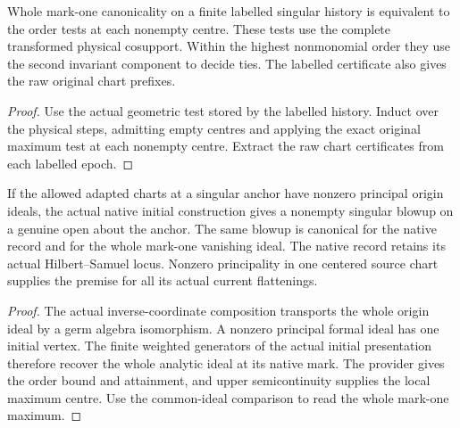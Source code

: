 \begin{theorem}
\label{hir:g8-labelled-whole-mark-one-prefix-criterion}
\leanok
Whole mark-one canonicality on a finite labelled singular
history is equivalent to the order tests at each nonempty
centre. These tests use the complete transformed physical
cosupport. Within the highest nonmonomial order they use
the second invariant component to decide ties. The labelled
certificate also gives the raw original chart prefixes.
\end{theorem}
\begin{proof}
Use the actual geometric test stored by the labelled
history. Induct over the physical steps, admitting empty
centres and applying the exact original maximum test at
each nonempty centre. Extract the raw chart certificates
from each labelled epoch.
\end{proof}

\begin{theorem}
\label{hir:g8-principal-native-initialization}
\leanok
If the allowed adapted charts at a singular anchor have
nonzero principal origin ideals, the actual native initial
construction gives a nonempty singular blowup on a genuine
open about the anchor. The same blowup is canonical for the
native record and for the whole mark-one vanishing ideal.
The native record retains its actual Hilbert--Samuel locus.
Nonzero principality in one centered source chart supplies
the premise for all its actual current flattenings.
\end{theorem}
\begin{proof}
The actual inverse-coordinate composition transports the
whole origin ideal by a germ algebra isomorphism.
A nonzero principal formal ideal has one initial vertex.
The finite weighted generators of the actual initial presentation
therefore recover the whole analytic ideal at its native mark.
The provider gives the order bound and attainment, and upper
semicontinuity supplies the local maximum centre. Use the
common-ideal comparison to read the whole mark-one maximum.
\end{proof}

